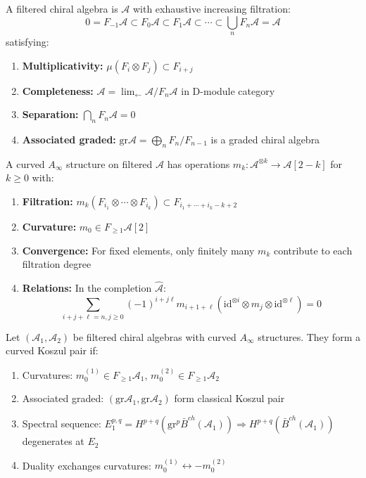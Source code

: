 \begin{definition}
A filtered chiral algebra is $\mathcal{A}$ with exhaustive increasing filtration:
$$0 = F_{-1}\mathcal{A} \subset F_0\mathcal{A} \subset F_1\mathcal{A} \subset \cdots \subset \bigcup_n F_n\mathcal{A} = \mathcal{A}$$
satisfying:
\begin{enumerate}
\item \textbf{Multiplicativity:} $\mu(F_i \otimes F_j) \subset F_{i+j}$
\item \textbf{Completeness:} $\mathcal{A} = \lim_{\leftarrow} \mathcal{A}/F_n\mathcal{A}$ in D-module category
\item \textbf{Separation:} $\bigcap_n F_n\mathcal{A} = 0$
\item \textbf{Associated graded:} $\text{gr}\mathcal{A} = \bigoplus_n F_n/F_{n-1}$ is a graded chiral algebra
\end{enumerate}
\end{definition}

\begin{definition}
A curved $A_\infty$ structure on filtered $\mathcal{A}$ has operations $m_k: \mathcal{A}^{\otimes k} \to \mathcal{A}[2-k]$ for $k \geq 0$ with:
\begin{enumerate}
\item \textbf{Filtration:} $m_k(F_{i_1} \otimes \cdots \otimes F_{i_k}) \subset F_{i_1+\cdots+i_k-k+2}$
\item \textbf{Curvature:} $m_0 \in F_{\geq 1}\mathcal{A}[2]$
\item \textbf{Convergence:} For fixed elements, only finitely many $m_k$ contribute to each filtration degree
\item \textbf{Relations:} In the completion $\widehat{\mathcal{A}}$:
   $$\sum_{i+j+\ell=n, j \geq 0} (-1)^{i+j\ell} m_{i+1+\ell}(\text{id}^{\otimes i} \otimes m_j \otimes \text{id}^{\otimes \ell}) = 0$$
\end{enumerate}
\end{definition}

\begin{theorem}
Let $(\mathcal{A}_1, \mathcal{A}_2)$ be filtered chiral algebras with curved $A_\infty$ structures. They form a curved Koszul pair if:
\begin{enumerate}
\item Curvatures: $m_0^{(1)} \in F_{\geq 1}\mathcal{A}_1$, $m_0^{(2)} \in F_{\geq 1}\mathcal{A}_2$
\item Associated graded: $(\text{gr}\mathcal{A}_1, \text{gr}\mathcal{A}_2)$ form classical Koszul pair
\item Spectral sequence: $E_1^{p,q} = H^{p+q}(\text{gr}^p\bar{B}^{ch}(\mathcal{A}_1)) \Rightarrow H^{p+q}(\bar{B}^{ch}(\mathcal{A}_1))$ degenerates at $E_2$
\item Duality exchanges curvatures: $m_0^{(1)} \leftrightarrow -m_0^{(2)}$
\end{enumerate}
\end{theorem}
 
